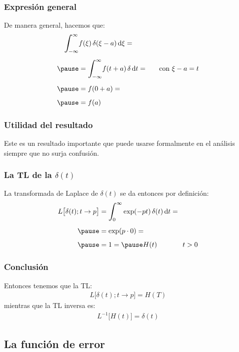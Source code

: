\documentclass[12pt]{beamer}
\begin{document}
\begin{frame}
\frametitle{Expresión general}
De manera general, hacemos que:
\pause
\begin{eqnarray}
\begin{aligned}[b]
\scaleint{6ex}_{\bs - \infty}^{\infty} &f(\xi) \, \delta (\xi - a) \dd{\xi} = \\[0.5em] \pause
&= \scaleint{6ex}_{\bs - \infty}^{\infty} f(t + a) \, \delta \dd{t} =  \hspace{0.6cm} \mbox{con  } \xi - a = t \\[0.5em] \pause
&= f(0 + a) = \\[0.5em] \pause
&= f(a)
\end{aligned}
\label{eq:ecuacion_03_31}
\end{eqnarray}
\end{frame}
\begin{frame}
\frametitle{Utilidad del resultado}
Este es un resultado importante que puede usarse formalmente en el análisis siempre que no surja confusión.
\end{frame}
\begin{frame}
\frametitle{La TL de la $\delta (t)$}
La transformada de Laplace de $\delta (t)$ se da entonces por definición:
\pause
\begin{eqnarray}
\begin{aligned}[b]
L \big[ \delta (t); t \to p \big] &= \scaleint{6ex}_{\bs 0}^{\infty} \exp(- p t) \, \delta (t) \dd{t} = \\[0.5em] \pause
&= \exp( p \cdot 0) = \\[0.5em] \pause
&= 1 = \pause H (t) \hspace{1.3cm} t > 0
\end{aligned}
\label{eq:ecuacion_03_32}
\end{eqnarray}
\end{frame}
\begin{frame}
\frametitle{Conclusión}
Entonces tenemos que la TL:
\pause
\begin{align*}
L \big[ \delta (t); t \to p \big] = H (T)
\end{align*}
\pause
mientras que la TL inversa es:
\pause
\begin{align}
L^{-1} \big[ H (t) \big] = \delta (t)
\label{eq:ecuacion_03_33}
\end{align}
\end{frame}

\subsection{La función de error}
\end{document}
